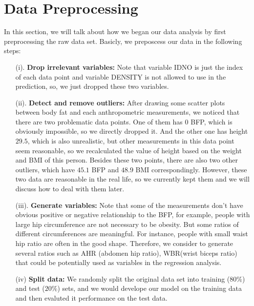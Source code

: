 \documentclass[letterpaper,10pt]{article}
\begin{document}
\section{Data Preprocessing}
In this section, we will talk about how we began our data analysis by first preprocessing the raw data set. Basicly, we preposcess our data in the following steps:
\begin{itemize}
\item[(i).] \textbf{Drop irrelevant variables:} Note that variable IDNO is just the index of each data point and variable DENSITY is not allowed to use in the prediction, so, we just dropped these two variables. 
\item[(ii).] \textbf{Detect and remove outliers:} After drawing some scatter plots between body fat and each anthropometric measurements, we noticed that there are two problematic data points. One of them has $0$ BFP, which is obviously impossible, so we directly dropped it. And the other one has  height $29.5$, which is also unrealistic, but other measurements in this data point seem reasonable, so we recalculated the value of height based on the weight and BMI of this person. Besides these two points, there are also two other outliers, which have $45.1$ BFP and $48.9$ BMI correspondingly. However, these two data are reasonable in the real life, so we currently kept them and we will discuss how to deal with them later.
\item[(iii).] \textbf{Generate variables:} Note that some of the measurements don't have obvious positive or negative relationship to the BFP, for example, people with large hip circumference are not necessary to be obesity. But some ratios of different circumferences are meaningful. For instance, people with small waist hip ratio are often in the good shape. Therefore, we consider to generate several ratios such as AHR (abdomen hip ratio), WBR(wrist biceps ratio) that could be potentially used as variables in the regression analysis.
\item[(iv)] \textbf{Split data:} We randomly split the original data set into training ($80\%$) and test ($20\%$) sets, and we would develope our model on the training data and then evaluted it performance on the test data.
\end{itemize}
 
\end{document}
